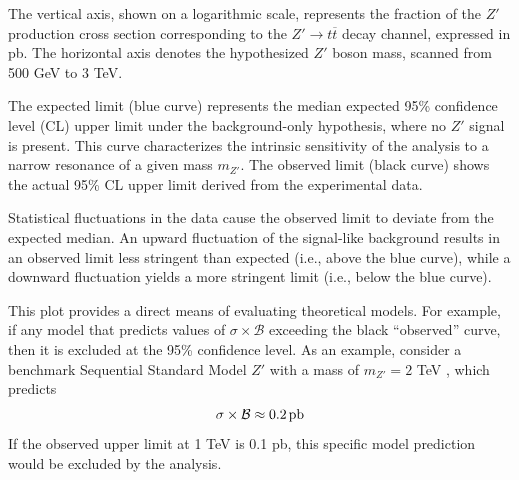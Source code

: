 The vertical axis, shown on a logarithmic scale, represents the fraction of the $Z'$ production cross section corresponding to the \texorpdfstring{$Z' \rightarrow t\overline{t}$}{} decay channel, expressed in pb. The horizontal axis denotes the hypothesized $Z'$ boson mass, scanned from 500 GeV to 3 TeV.

The expected limit (blue curve) represents the median expected 95\% confidence level (CL) upper limit under the background-only hypothesis, where no $Z'$ signal is present. This curve characterizes the intrinsic sensitivity of the analysis to a narrow resonance of a given mass $m_{Z'}$. The observed limit (black curve) shows the actual 95\% CL upper limit derived from the experimental data.

Statistical fluctuations in the data cause the observed limit to deviate from the expected median. An upward fluctuation of the signal-like background results in an observed limit less stringent than expected (i.e., above the blue curve), while a downward fluctuation yields a more stringent limit (i.e., below the blue curve).

This plot provides a direct means of evaluating theoretical models. For example, if any model that predicts values of $\sigma \times \mathcal{B}$ exceeding the black \enquote{observed} curve, then it is excluded at the 95\% confidence level. As an example, consider a benchmark Sequential Standard Model $Z'$ with a mass of $m_{Z'} = 2$ TeV , which predicts $$\sigma \times \mathcal{B} \approx 0.2 \hspace{1.5pt} \text{pb}$$
\noindent
If the observed upper limit at 1 TeV is 0.1 pb, this specific model prediction would be excluded by the analysis.